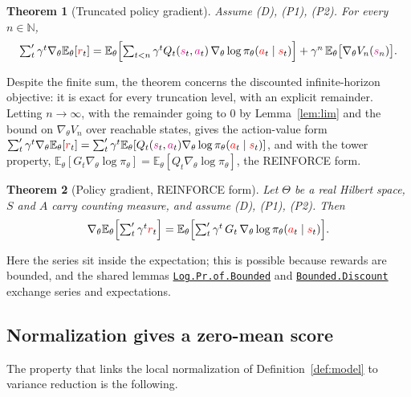 \documentclass[11pt,a4paper]{article}
\newcommand{\lmod}[2]{\href{http://www.lemma.cn/lean/?module=#2}{\nolinkurl{#1}}}
\newtheorem{theorem}{Theorem}[section]
\newcommand{\N}{\mathbb{N}}
\newcommand{\E}{\mathbb{E}}
\newcommand{\rv}[1]{{\color{red}#1}}       %
\newcommand{\ra}[1]{{\color{magenta}#1}}   %
\newcommand{\sv}{\rv{s}}
\newcommand{\av}{\rv{a}}
\newcommand{\rw}{\rv{r}}
\newcommand{\grad}{\nabla_{\theta}}
\newcommand{\tsum}{\textstyle\sum'}
\begin{document}
\begin{theorem}[Truncated policy gradient]
\label{thm:trunc}
Assume (D), (P1), (P2).
For every $n\in\N$,
\[
\tsum_t\gamma^t\grad\E_\theta[\rw_t]=\E_\theta\Bigl[\sum_{t<n}\gamma^tQ_t(\ra{s}_t,\ra{a}_t)\,\grad\log\pi_\theta(\av_t\mid\sv_t)\Bigr]+\gamma^n\,\E_\theta\bigl[\grad V_n(\ra{s}_n)\bigr].
\]
\end{theorem}
Despite the finite sum, the theorem concerns the discounted infinite-horizon objective: it is exact for every truncation level, with an explicit remainder.
Letting $n\to\infty$, with the remainder going to $0$ by Lemma~\ref{lem:lim} and the bound on $\grad V_n$ over reachable states, gives the action-value form
$\tsum_t\gamma^t\grad\E_\theta[\rw_t]=\tsum_t\gamma^t\E_\theta[Q_t(\ra{s}_t,\ra{a}_t)\grad\log\pi_\theta(\av_t\mid\sv_t)]$, and with the tower property, $\E_\theta[G_t\grad\log\pi_\theta]=\E_\theta[Q_t\grad\log\pi_\theta]$, the REINFORCE form.

\begin{theorem}[Policy gradient, REINFORCE form]
\label{thm:pgt}
Let $\Theta$ be a real Hilbert space, $S$ and $A$ carry counting measure, and assume (D), (P1), (P2).
Then
\[
\grad\E_\theta\Bigl[\tsum_t\gamma^t\rw_t\Bigr]=\E_\theta\Bigl[\tsum_t\gamma^t\,G_t\,\grad\log\pi_\theta(\av_t\mid\sv_t)\Bigr].
\]
\end{theorem}
Here the series sit inside the expectation; this is possible because rewards are bounded, and the shared lemmas \lmod{Log.Pr.of.Bounded}{Tensor.Eq.Expect.Sum.Grad.Log.Pr.of.Bounded} and \lmod{Bounded.Discount}{Tensor.Eq.Expect.Sum.Grad.Log.Pr.of.Bounded.Discount} exchange series and expectations.


\subsection{Normalization gives a zero-mean score}
\label{sec:zeroscore}
The property that links the local normalization of Definition~\ref{def:model} to variance reduction is the following.
\end{document}
